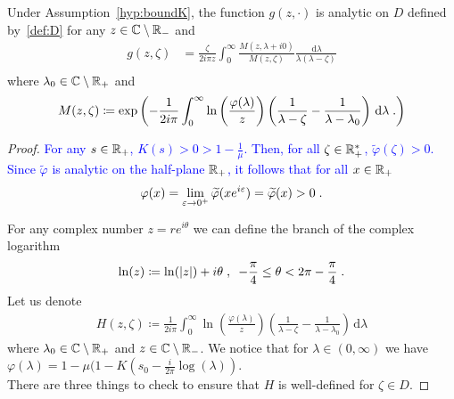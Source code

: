 \documentclass[11pt]{amsart}
\newcommand{\f}{\frac}
\newcommand{\blue}[1]{\textcolor{blue}{#1}}
\newcommand{\diff}{\,\mathrm{d}}
\begin{document}
\begin{proposition}
\label{p:explicit_g}
Under Assumption~\ref{hyp:boundK}, the function $g(z, \cdot)$ is analytic on $D$ defined by~\eqref{def:D} for any $z \in \mathbb{C} \setminus \mathbb{R}_-$ and
\begin{align*}
    g(z,\zeta) 
    &= 
    \frac{\zeta}{2i\pi z}\int_0^\infty  \frac{M(z,\lambda+i0)}{M(z,\zeta)} \frac{\diff \lambda}{\lambda(\lambda-\zeta)} \\
\end{align*}
where $\lambda_0 \in \mathbb{C} \setminus \mathbb{R}_+$ and 
$$ M(z, \zeta) \coloneqq \exp\left(-{\frac{1}{2i\pi  }\int_0^\infty \ln\left(\frac{\varphi(\lambda)}{z}\right) \left( \frac{1}{\lambda-\zeta} - \frac{1}{\lambda-\lambda_0}\right) \diff \lambda} \eqfinp\right)$$ 
\end{proposition}
\begin{proof}
\blue{For any $s \in \mathbb{R}_+$, $K(s) > 0 > 1 - \frac1\mu$. Then, 
for all $\zeta \in \mathbb{R}_+^*$, $\tilde \varphi(\zeta) > 0$.
Since $\tilde \varphi$ is analytic on the half-plane $\mathbb{R}_+$, it follows that for all $x \in \mathbb{R}_+$ 
    $$\varphi(x) = \lim_{\varepsilon \to 0^+} \widetilde \varphi(xe^{i\varepsilon}) = \widetilde \varphi(x) > 0 \; .$$
}

For any complex number $z = re^{i\theta}$ we can define the branch of the complex logarithm
\begin{equation}\label{def:log}
\ln(z) \coloneqq \ln(|z|) + i\theta \; , \enspace -\frac{\pi}{4} \leq \theta < 2\pi - \frac{\pi}{4}  \; .
\end{equation}
Let us denote
    \begin{align}\label{def:H}
        H(z,\zeta) \coloneqq \frac{1}{2i\pi }\int_0^\infty \ln\left(\frac{\varphi(\lambda)}{z}\right) \left( \frac{1}{\lambda-\zeta} - \frac{1}{\lambda-\lambda_0}\right) \diff \lambda
    \end{align}
where $\lambda_0 \in \mathbb{C} \setminus \mathbb{R}_+$ and \blue{$z \in \mathbb{C} \setminus \mathbb{R}_-$}. We notice that for $\lambda \in (0,\infty)$ we have $\varphi(\lambda)=1-\mu(1-K(s_0-\f{i}{2\pi} \log(\lambda))$.\\

There are three things to check to ensure that $H$ is well-defined for $\zeta \in D$. 


\end{proof}
\end{document}
